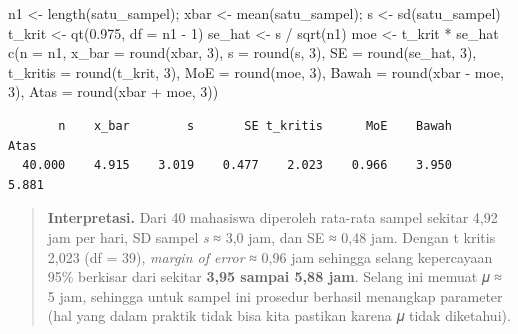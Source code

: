 \documentclass[
  indonesian,
  letterpaper,
]{book}
\newenvironment{Shaded}{\begin{snugshade}}{\end{snugshade}}
\newcommand{\AttributeTok}[1]{\textcolor[rgb]{0.40,0.45,0.13}{#1}}
\newcommand{\CommentTok}[1]{\textcolor[rgb]{0.37,0.37,0.37}{#1}}
\newcommand{\DecValTok}[1]{\textcolor[rgb]{0.68,0.00,0.00}{#1}}
\newcommand{\FloatTok}[1]{\textcolor[rgb]{0.68,0.00,0.00}{#1}}
\newcommand{\FunctionTok}[1]{\textcolor[rgb]{0.28,0.35,0.67}{#1}}
\newcommand{\NormalTok}[1]{\textcolor[rgb]{0.00,0.23,0.31}{#1}}
\newcommand{\OtherTok}[1]{\textcolor[rgb]{0.00,0.23,0.31}{#1}}
\newcommand{\SpecialCharTok}[1]{\textcolor[rgb]{0.37,0.37,0.37}{#1}}
\begin{document}
\begin{Shaded}
\begin{Highlighting}[]
\NormalTok{n1 }\OtherTok{\textless{}{-}} \FunctionTok{length}\NormalTok{(satu\_sampel); xbar }\OtherTok{\textless{}{-}} \FunctionTok{mean}\NormalTok{(satu\_sampel); s }\OtherTok{\textless{}{-}} \FunctionTok{sd}\NormalTok{(satu\_sampel)}
\NormalTok{t\_krit }\OtherTok{\textless{}{-}} \FunctionTok{qt}\NormalTok{(}\FloatTok{0.975}\NormalTok{, }\AttributeTok{df =}\NormalTok{ n1 }\SpecialCharTok{{-}} \DecValTok{1}\NormalTok{)}
\NormalTok{se\_hat }\OtherTok{\textless{}{-}}\NormalTok{ s }\SpecialCharTok{/} \FunctionTok{sqrt}\NormalTok{(n1)}
\NormalTok{moe }\OtherTok{\textless{}{-}}\NormalTok{ t\_krit }\SpecialCharTok{*}\NormalTok{ se\_hat}
\FunctionTok{c}\NormalTok{(}\AttributeTok{n =}\NormalTok{ n1, }\AttributeTok{x\_bar =} \FunctionTok{round}\NormalTok{(xbar, }\DecValTok{3}\NormalTok{), }\AttributeTok{s =} \FunctionTok{round}\NormalTok{(s, }\DecValTok{3}\NormalTok{), }\AttributeTok{SE =} \FunctionTok{round}\NormalTok{(se\_hat, }\DecValTok{3}\NormalTok{),}
\AttributeTok{t\_kritis =} \FunctionTok{round}\NormalTok{(t\_krit, }\DecValTok{3}\NormalTok{), }\AttributeTok{MoE =} \FunctionTok{round}\NormalTok{(moe, }\DecValTok{3}\NormalTok{),}
\AttributeTok{Bawah =} \FunctionTok{round}\NormalTok{(xbar }\SpecialCharTok{{-}}\NormalTok{ moe, }\DecValTok{3}\NormalTok{), }\AttributeTok{Atas =} \FunctionTok{round}\NormalTok{(xbar }\SpecialCharTok{+}\NormalTok{ moe, }\DecValTok{3}\NormalTok{))}
\end{Highlighting}
\end{Shaded}

\begin{verbatim}
       n    x_bar        s       SE t_kritis      MoE    Bawah     Atas 
  40.000    4.915    3.019    0.477    2.023    0.966    3.950    5.881 
\end{verbatim}

\begin{quote}
\textbf{Interpretasi.} Dari 40 mahasiswa diperoleh rata-rata sampel
sekitar 4,92 jam per hari, SD sampel \emph{s} ≈ 3,0 jam, dan SE ≈ 0,48
jam. Dengan t kritis 2,023 (df = 39), \emph{margin of error} ≈ 0,96 jam
sehingga selang kepercayaan 95\% berkisar dari sekitar \textbf{3,95
sampai 5,88 jam}. Selang ini memuat 𝜇 ≈ 5 jam, sehingga untuk sampel ini
prosedur berhasil menangkap parameter (hal yang dalam praktik tidak bisa
kita pastikan karena 𝜇 tidak diketahui).
\end{quote}

\begin{Shaded}
\end{Shaded}
\end{document}
